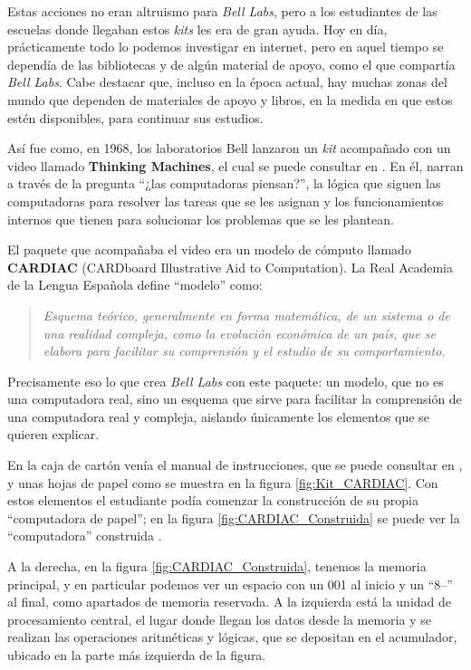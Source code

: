 \documentclass[letterpaper,12pt,oneside]{book}
\begin{document}
		
		
		Estas acciones no eran altruismo para \textit{Bell Labs}, pero a los estudiantes de las 
		escuelas donde
		llegaban estos \textit{kits} les era de gran ayuda. Hoy en día, prácticamente todo lo podemos investigar en internet, pero en aquel tiempo se dependía de las
		bibliotecas y de algún material de apoyo, como el que compartía \textit{Bell Labs}. Cabe destacar que, incluso en la época actual, hay muchas zonas del mundo
		que dependen de materiales de apoyo y libros, en la medida en que estos estén disponibles, para continuar sus estudios.
		
		Así fue como, en 1968, los laboratorios Bell lanzaron un \textit{kit} acompañado con un video llamado \textbf{Thinking Machines}, el
		cual se puede consultar en  \cite{att_tech_channel_att_2012}. En él,  narran
		a través de la pregunta ``¿las computadoras piensan?'', la lógica que siguen las computadoras para resolver las tareas que se les asignan y los funcionamientos
		internos que tienen para solucionar los problemas que se les plantean.

        El paquete que acompañaba el video era un modelo de cómputo llamado \textbf{CARDIAC} (CARDboard Illustrative Aid to Computation). La Real Academia de la Lengua Española define  ``modelo'' como:
        \begin{quote}
			\emph{ Esquema teórico, generalmente en forma matemática, de un sistema o de una realidad compleja, como la evolución económica de un país, que se elabora para facilitar su comprensión y el estudio de su comportamiento}.
		\end{quote}

        Precisamente eso lo que crea \textit{Bell Labs} con este paquete: un modelo, que no es una computadora real, sino un esquema
        que sirve para facilitar la comprensión de una computadora real y compleja, aislando únicamente los elementos que se quieren explicar.
        
  
        En la caja de cartón venía el manual de instrucciones, que se puede consultar en  
		\cite{fingerman_instruction_1968}, y unas hojas de papel como se muestra en la figura \ref{fig:Kit_CARDIAC}. Con estos elementos el 
		estudiante podía comenzar la construcción de su propia ``computadora de papel''; en la figura \ref{fig:CARDIAC_Construida} se puede
		ver la ``computadora'' construida \cite{megardi_cardiac_nodate}.
  
		A la derecha, en la figura \ref{fig:CARDIAC_Construida}, tenemos la memoria principal, y en particular podemos ver un espacio con un 001 al inicio y un ``8--'' al final, como apartados de memoria reservada. A la izquierda
		está la unidad de procesamiento central, el lugar donde llegan los datos desde la memoria y se realizan las operaciones aritméticas y lógicas,
		que se depositan en el acumulador, ubicado en la parte más izquierda de la figura.
		
\end{document}
